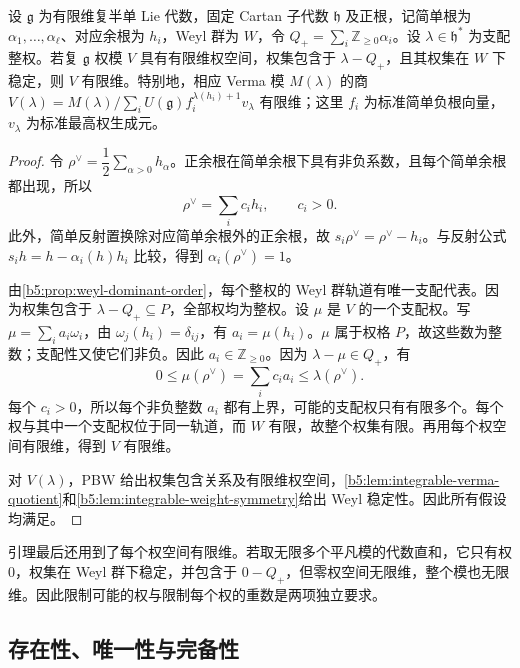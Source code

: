 \begin{lemma}\label{b5:lem:highest-integrable-finite}
	设 \(\mathfrak g\) 为有限维复半单 Lie 代数，固定 Cartan 子代数 \(\mathfrak h\) 及正根，记简单根为 \(\alpha_1,\ldots,\alpha_\ell\)、对应余根为 \(h_i\)，Weyl 群为 \(W\)，令 \(Q_+=\sum_i\mathbb Z_{\ge0}\alpha_i\)。设 \(\lambda\in\mathfrak h^*\) 为支配整权。若复 \(\mathfrak g\) 权模 \(V\) 具有有限维权空间，权集包含于 \(\lambda-Q_+\)，且其权集在 \(W\) 下稳定，则 \(V\) 有限维。特别地，相应 Verma 模 \(M(\lambda)\) 的商 \(V(\lambda)=M(\lambda)/\sum_iU(\mathfrak g)f_i^{\lambda(h_i)+1}v_\lambda\) 有限维；这里 \(f_i\) 为标准简单负根向量，\(v_\lambda\) 为标准最高权生成元。
\end{lemma}
\begin{proof}
	令 \(\rho^\vee=\dfrac12\sum_{\alpha>0}h_\alpha\)。正余根在简单余根下具有非负系数，且每个简单余根都出现，所以
	\[
		\rho^\vee=\sum_i c_i h_i,\qquad c_i>0.
	\]
	此外，简单反射置换除对应简单余根外的正余根，故 \(s_i\rho^\vee=\rho^\vee-h_i\)。与反射公式 \(s_i h=h-\alpha_i(h)h_i\) 比较，得到 \(\alpha_i(\rho^\vee)=1\)。

	由\cref{b5:prop:weyl-dominant-order}，每个整权的 Weyl 群轨道有唯一支配代表。因为权集包含于 \(\lambda-Q_+\subseteq P\)，全部权均为整权。设 \(\mu\) 是 \(V\) 的一个支配权。写 \(\mu=\sum_i a_i\omega_i\)，由 \(\omega_j(h_i)=\delta_{ij}\)，有 \(a_i=\mu(h_i)\)。\(\mu\) 属于权格 \(P\)，故这些数为整数；支配性又使它们非负。因此 \(a_i\in\mathbb Z_{\ge0}\)。因为 \(\lambda-\mu\in Q_+\)，有
	\[
		0\le\mu(\rho^\vee)=\sum_i c_i a_i\le\lambda(\rho^\vee).
	\]
	每个 \(c_i>0\)，所以每个非负整数 \(a_i\) 都有上界，可能的支配权只有有限多个。每个权与其中一个支配权位于同一轨道，而 \(W\) 有限，故整个权集有限。再用每个权空间有限维，得到 \(V\) 有限维。

	对 \(V(\lambda)\)，PBW 给出权集包含关系及有限维权空间，\cref{b5:lem:integrable-verma-quotient}和\cref{b5:lem:integrable-weight-symmetry}给出 Weyl 稳定性。因此所有假设均满足。
\end{proof}

引理最后还用到了每个权空间有限维。若取无限多个平凡模的代数直和，它只有权 \(0\)，权集在 Weyl 群下稳定，并包含于 \(0-Q_+\)，但零权空间无限维，整个模也无限维。因此限制可能的权与限制每个权的重数是两项独立要求。

\subsection{存在性、唯一性与完备性}
\label{b5:subsec:1804:02}

